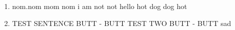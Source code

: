 \begin{enumerate}
\item
		{nom.nom mom nom}
		{i am {not not}}
		{hello hot dog dog hot}
\item
		{{} {TEST SENTENCE} {BUTT -} {BUTT}}
		{TEST TWO {BUTT -} BUTT}
		{sad}
\end{enumerate}